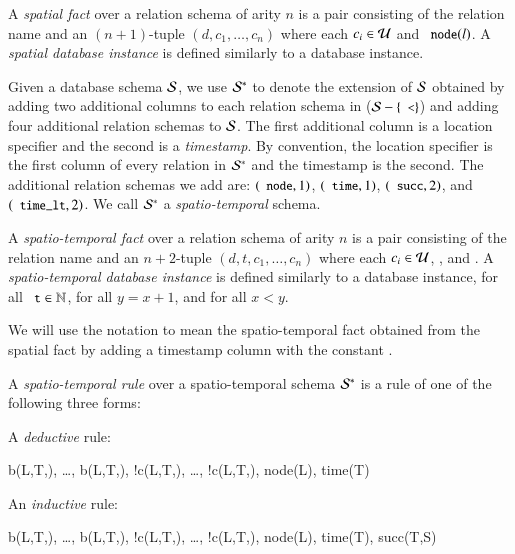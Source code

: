 A {\em spatial fact} over a relation schema of arity $n$ is a pair consisting of the relation name and an $(n+1)$-tuple $(d,c_1,\ldots,c_n)$ where each $c_i \in \univ$ and $\dedalus{node}(l)$.  A {\em spatial database instance} is defined similarly to a database instance.

Given a database schema $\schema$, we use $\stschema$ to denote the extension of
$\schema$ obtained by adding two additional columns to each relation schema in ($\schema - \{\dedalus{<}\}$) and adding four additional relation schemas to $\schema$. 
The first additional column is a location specifier and the second is a {\em timestamp}.  By convention, the location specifier is the first column of every relation in $\stschema$ and the timestamp is the second.  
The additional relation schemas we add are: $(\dedalus{node},1)$,
$(\dedalus{time},1)$, $(\dedalus{succ},2)$, and $(\dedalus{time_lt},2)$.
We call $\stschema$ a {\em spatio-temporal} schema.

A {\em spatio-temporal fact} over a relation schema of arity $n$ is a pair consisting of the relation name and an $n+2$-tuple $(d,t,c_1,\ldots,c_n)$ where each $c_i \in \univ$, , and .  A {\em spatio-temporal database instance} is defined similarly to a database instance,  for all $\dedalus{t} \in \mathbb{N}$,  for all $y = x + 1$, and  for all $x < y$.

We will use the notation  to mean the spatio-temporal fact obtained from the spatial fact  by adding a timestamp column with the constant .

A {\em spatio-temporal rule} over a spatio-temporal schema $\stschema$ is a rule of one of the following three forms:

A {\em deductive} rule:

\begin{Drules}
        {b(L,T,), \ldots, b(L,T,), !c(L,T,), \ldots, !c(L,T,), node(L), time(T)}
\end{Drules}

An {\em inductive} rule:

\begin{Drules}
        {b(L,T,), \ldots, b(L,T,), !c(L,T,), \ldots, !c(L,T,), node(L), time(T), succ(T,S)}
\end{Drules}

